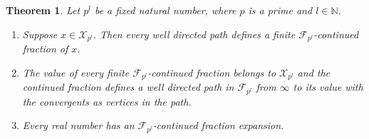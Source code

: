 \documentclass[12pt]{elsarticle}
\newtheorem{theorem}{Theorem}[section]
\theoremstyle{definition}
\newcommand{\field}[1]{\mathbb{#1}}          \newcommand{\Q}{\field{Q}}
\newcommand{\N}{\field{N}}
\newcommand{\mX}{{\mathcal X}}
\newcommand{\f}{{\mathcal F}}
\newcommand{\ep}{\epsilon}
\begin{document}
%		
%			
%			
%		
	\begin{theorem}\cite[Theorem 3.5]{seemafnpart1}\label{main1} Let $p^l$ be a fixed natural number, where $p$ is a prime and $l\in \N$.
		\begin{enumerate}
			
			\item Suppose $x\in\mX_{p^l}$.  Then every well directed path defines a finite $\f_{p^l}$-continued fraction of $x$.
			\item The value of every finite $\f_{p^l}$-continued fraction belongs to $\mX_{p^l}$ and the continued fraction defines a well directed path in $\f_{p^l}$ from $\infty$ to its value with the convergents as  vertices in the path.
			\item 	Every real number has an $\mathcal{F}_{p^l}$-continued fraction expansion.
		\end{enumerate}
	\end{theorem}
\end{document}
